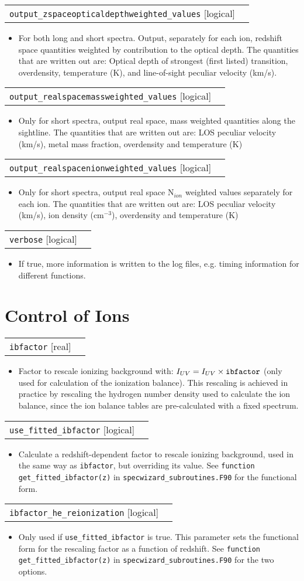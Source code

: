 \documentclass{report}
\makeatletter
\newcommand{\paramdefinition}[3]{
\begin{tabular*}{\textwidth}{l@{\extracolsep{\fill}}r}
		{\tt #1} [{\sc #2}]& #3 \\
\end{tabular*}}
\newcommand{\paramdescription}[1]{
\begin{itemize}
\item #1
\end{itemize}\vspace{0.2cm}}
\newcommand{\param}[1]{{\tt #1}}
\makeatother
\begin{document}
\paramdefinition{output\_zspaceopticaldepthweighted\_values}{logical}{ }
\paramdescription{For both long and short spectra. Output, separately for each ion, redshift space quantities weighted by contribution to the optical depth. The quantities that are written out are:  Optical depth of strongest (first listed) transition, overdensity, temperature (K), and line-of-sight peculiar velocity (km/s).}

\paramdefinition{output\_realspacemassweighted\_values}{logical}{ }
\paramdescription{Only for short spectra, output real space, mass weighted quantities along the sightline.  The quantities that are written out are: LOS peculiar velocity (km/s), metal mass fraction, overdensity and temperature (K)}

\paramdefinition{output\_realspacenionweighted\_values}{logical}{ }
\paramdescription{Only for short spectra, output real space N$_{ion}$ weighted values separately for each ion.  The quantities that are written out are: LOS peculiar velocity (km/s), ion density (cm$^{-3}$), overdensity and temperature (K)}

\paramdefinition{verbose}{logical}{ }
\paramdescription{If true, more information is written to the log files, e.g. timing information for different functions.}


\section{Control of Ions}

\paramdefinition{ibfactor}{real}{}
\paramdescription{Factor to rescale ionizing background with: $I_{UV} = I_{UV}\times{\tt ibfactor}$ (only used for calculation of the ionization balance). This rescaling is achieved in practice by rescaling the hydrogen number density used to calculate the ion balance, since the ion balance tables are pre-calculated with a fixed spectrum.}

\paramdefinition{use\_fitted\_ibfactor}{logical}{}
\paramdescription{Calculate a redshift-dependent factor to rescale ionizing background, used in the same way as \param{ibfactor}, but overriding its value. See \param{function get\_fitted\_ibfactor(z)} in \param{specwizard\_subroutines.F90} for the functional form.}

\paramdefinition{ibfactor\_he\_reionization}{logical}{}
\paramdescription{Only used if \param{use\_fitted\_ibfactor} is true. This parameter sets the functional form for the rescaling factor as a function of redshift. See \param{function get\_fitted\_ibfactor(z)} in \param{specwizard\_subroutines.F90} for the two options.}
\end{document}
